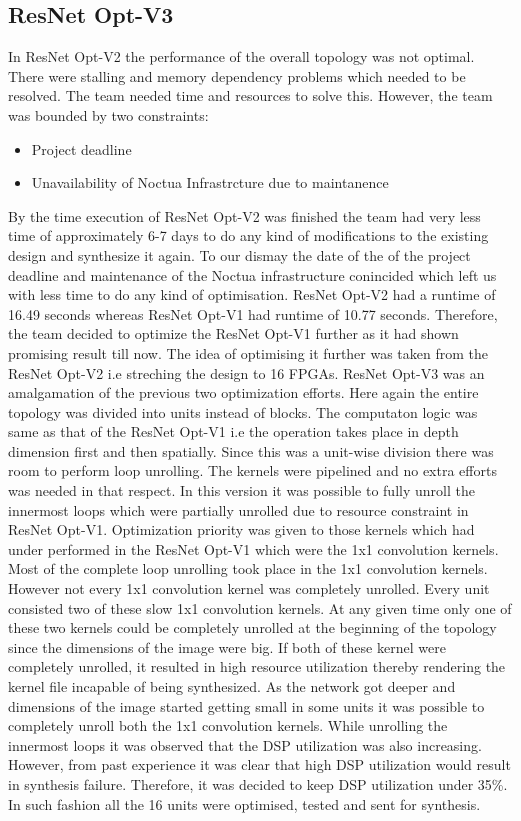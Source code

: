 \subsection{ResNet Opt-V3}
In ResNet Opt-V2 the performance of the overall topology was not optimal. There were stalling and memory dependency problems which needed to be resolved. The team needed time and resources to solve this. However, the team was bounded by two constraints: 
\begin{itemize}
    \item Project deadline 
    \item Unavailability of Noctua Infrastrcture due to maintanence 
\end{itemize}
By the time execution of ResNet Opt-V2 was finished the team had very less time of approximately 6-7 days to do any kind of modifications to the existing design and synthesize it again. To our dismay the date of the of the project deadline and maintenance of the Noctua infrastructure conincided which left us with less time to do any kind of optimisation. ResNet Opt-V2 had a runtime of 16.49 seconds whereas ResNet Opt-V1 had runtime of 10.77 seconds. Therefore, the team decided to optimize the ResNet Opt-V1 further as it had shown promising result till now. The idea of optimising it further was taken from the ResNet Opt-V2 i.e streching the design to 16 FPGAs. ResNet Opt-V3 was an amalgamation of the previous two optimization efforts. 
\newline
Here again the entire topology was divided into units instead of blocks. The computaton logic was same as that of the ResNet Opt-V1 i.e the operation takes place in depth dimension first and then spatially. Since this was a unit-wise division there was room to perform loop unrolling. The kernels were pipelined and no extra efforts was needed in that respect. In this version it was possible to fully unroll the innermost loops which were partially unrolled due to resource constraint in ResNet Opt-V1. Optimization priority was given to those kernels which had under performed in the ResNet Opt-V1 which were the 1x1 convolution kernels. 
\newline
Most of the complete loop unrolling took place in the 1x1 convolution kernels. However not every 1x1 convolution kernel was completely unrolled. Every unit consisted two of these slow 1x1 convolution kernels. At any given time only one of these two kernels could be completely unrolled at the beginning of the topology since the dimensions of the image were big. If both of these kernel were completely unrolled, it resulted in high resource utilization thereby rendering the kernel file incapable of being synthesized. As the network got deeper and dimensions of the image started getting small in some units it was possible to completely unroll both the 1x1 convolution kernels. While unrolling the innermost loops it was observed that the DSP utilization was also increasing. However, from past experience it was clear that high DSP utilization would result in synthesis failure. Therefore, it was decided to keep DSP utilization under 35\%. In such fashion all the 16 units were optimised, tested and sent for synthesis. 
